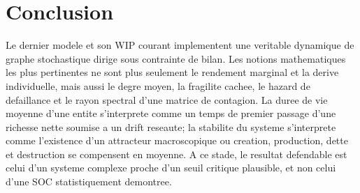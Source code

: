\documentclass[11pt,a4paper]{article}
\begin{document}
\section{Conclusion}
Le dernier modele et son WIP courant implementent une veritable dynamique de graphe stochastique dirige sous contrainte de bilan. Les notions mathematiques les plus pertinentes ne sont plus seulement le rendement marginal et la derive individuelle, mais aussi le degre moyen, la fragilite cachee, le hazard de defaillance et le rayon spectral d'une matrice de contagion. La duree de vie moyenne d'une entite s'interprete comme un temps de premier passage d'une richesse nette soumise a un drift reseaute; la stabilite du systeme s'interprete comme l'existence d'un attracteur macroscopique ou creation, production, dette et destruction se compensent en moyenne. A ce stade, le resultat defendable est celui d'un systeme complexe proche d'un seuil critique plausible, et non celui d'une SOC statistiquement demontree.
\end{document}
